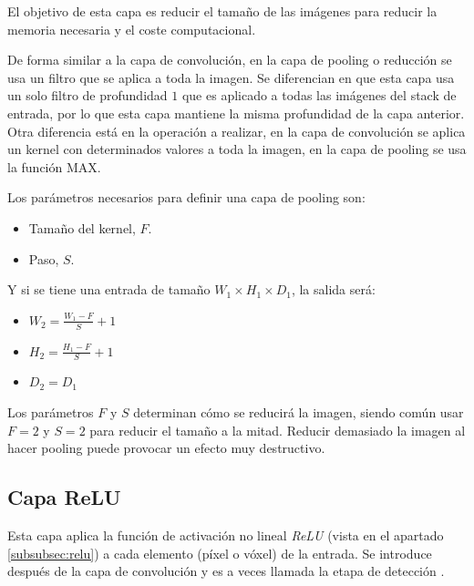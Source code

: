 El objetivo de esta capa es reducir el tamaño de las imágenes para reducir la memoria necesaria y el coste computacional.

De forma similar a la capa de convolución, en la capa de pooling o reducción se usa un filtro que se aplica a toda la imagen. Se diferencian en que esta capa usa un solo filtro de profundidad $1$ que es aplicado a todas las imágenes del stack de entrada, por lo que esta capa mantiene la misma profundidad de la capa anterior. Otra diferencia está en la operación a realizar, en la capa de convolución se aplica un kernel con determinados valores a toda la imagen, en la capa de pooling se usa la función MAX.

Los parámetros necesarios para definir una capa de pooling son:
\begin{itemize}
\item Tamaño del kernel, $F$.
\item Paso, $S$.
\end{itemize} 

Y si se tiene una entrada de tamaño $W_1 \times H_1 \times D_1$, la salida será:
\begin{itemize}
\item $W_2 = \frac{W_1 - F}{S} + 1$
\item $H_2 = \frac{H_1 - F}{S} + 1$
\item $D_2 = D_1$
\end{itemize}

Los parámetros $F$ y $S$ determinan cómo se reducirá la imagen, siendo común usar $F=2$ y $S=2$ para reducir el tamaño a la mitad. Reducir demasiado la imagen al hacer pooling puede provocar un efecto muy destructivo.


\subsection{Capa ReLU}\label{cnn_capa_relu}

Esta capa aplica la función de activación no lineal \textit{ReLU} (vista en el apartado \ref{subsubsec:relu}) a cada elemento (píxel o vóxel) de la entrada. Se introduce después de la capa de convolución y es a veces llamada la etapa de detección \cite[335]{Goodfellow2016}.

